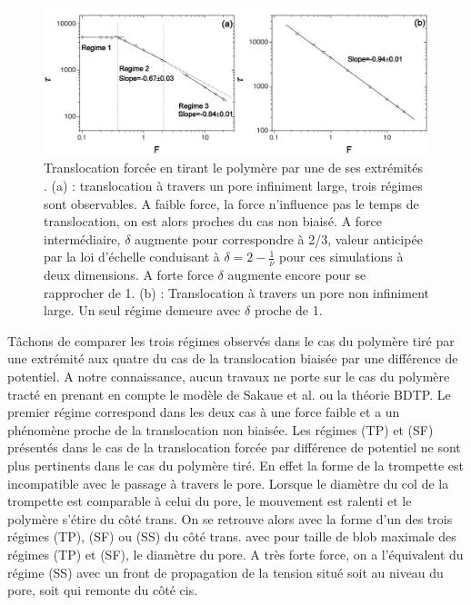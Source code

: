 \begin{figure}[H]
\begin{center}
\includegraphics[width=1\textwidth]{regimespulling.jpg}
\caption[Régimes de forces pour une translocation tractée]{Translocation forcée en tirant le polymère par une de ses extrémités \cite{Huopaniemi2007}. (a) : translocation à travers un pore infiniment large, trois régimes sont observables. A faible force, la force n'influence pas le temps de translocation, on est alors proches du cas non biaisé. A force intermédiaire, $\delta$ augmente pour correspondre à 2/3, valeur anticipée par la loi d'échelle conduisant à $\delta=2-\frac{1}{\nu}$ pour ces simulations à deux dimensions. A forte force $\delta$ augmente encore pour se rapprocher de 1. (b) : Translocation à travers un pore non infiniment large. Un seul régime demeure avec $\delta$ proche de 1.}
\label{regimestransloctractee}
\end{center}
\end{figure}

Tâchons de comparer les trois régimes observés dans le cas du polymère tiré par une extrémité aux quatre du cas de la translocation biaisée par une différence de potentiel. A notre connaissance, aucun travaux ne porte sur le cas du polymère tracté en prenant en compte le modèle de Sakaue et al. ou la théorie BDTP. Le premier régime correspond dans les deux cas à une force faible et a un phénomène proche de la translocation non biaisée. Les régimes (TP) et (SF) présentés dans le cas de la translocation forcée par différence de potentiel ne sont plus pertinents dans le cas du polymère tiré. En effet la forme de la trompette est incompatible avec le passage à travers le pore. Lorsque le diamètre du col de la trompette est comparable à celui du pore, le mouvement est ralenti et le polymère s'étire du côté trans. On se retrouve alors avec la forme d'un des trois régimes (TP), (SF) ou (SS) du côté trans. avec pour taille de blob maximale des régimes (TP) et (SF), le diamètre du pore. A très forte force, on a l'équivalent du régime (SS) avec un front de propagation de la tension situé soit au niveau du pore, soit qui remonte du côté cis. 


